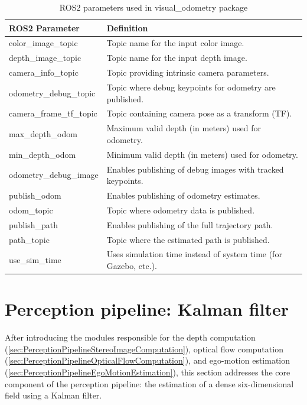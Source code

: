 \begin{table}[H]
  \centering
  \begin{tabular}{|l|l|}
  \hline
  \textbf{ROS2 Parameter} & \textbf{Definition} \\ \hline
  color\_image\_topic   & Topic name for the input color image. \\ \hline
  depth\_image\_topic   & Topic name for the input depth image. \\ \hline
  camera\_info\_topic   & Topic providing intrinsic camera parameters. \\ \hline
  odometry\_debug\_topic & Topic where debug keypoints for odometry are published. \\ \hline
  camera\_frame\_tf\_topic & Topic containing camera pose as a transform (TF). \\ \hline
  max\_depth\_odom & Maximum valid depth (in meters) used for odometry. \\ \hline
  min\_depth\_odom & Minimum valid depth (in meters) used for odometry. \\ \hline
  odometry\_debug\_image & Enables publishing of debug images with tracked keypoints. \\ \hline
  publish\_odom & Enables publishing of odometry estimates. \\ \hline
  odom\_topic & Topic where odometry data is published. \\ \hline
  publish\_path & Enables publishing of the full trajectory path. \\ \hline
  path\_topic & Topic where the estimated path is published. \\ \hline
  use\_sim\_time & Uses simulation time instead of system time (for Gazebo, etc.). \\ \hline
  \end{tabular}
  \caption{ROS2 parameters used in visual\_odometry package}\label{tab:ros2_vo_params}
\end{table}


\newpage
\section{Perception pipeline: Kalman filter}\label{sec:KalmanFilter}

After introducing the modules responsible for the depth computation (\ref{sec:PerceptionPipelineStereoImageComputation}), optical flow computation (\ref{sec:PerceptionPipelineOpticalFlowComputation}),
and ego-motion estimation (\ref{sec:PerceptionPipelineEgoMotionEstimation}), this section addresses the core component of the perception 
pipeline: the estimation of a dense six-dimensional field using a Kalman filter. 

